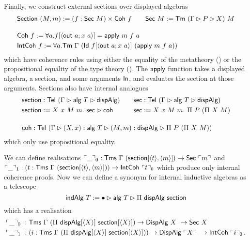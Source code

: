 Finally, we construct external sections over displayed algebras
\begin{align*}
     &\mta{Section}\ (M, m) := (f : \mta{Sec}\ M) \times \mta{Coh}\ f  \qquad \mta{Sec}\ M := \Tm\ (\Gamma \rhd P \rhd X)\ M \\[1em]
     &\mta{Coh}\ f := \forall a. f[\Msub{\mta{out}\ a; x\ a}] = \mta{apply}\ m\ f\ a \\
     &\mta{IntCoh}\ f := \forall a. \Tm\ \Gamma\ (\mta{Id}\ f[\Msub{\mta{out}\ a; x\ a}]\ (\mta{apply}\ m\ f\ a))
\end{align*}
which have coherence rules using either the equality of the metatheory () or
the propositional equality of the type theory ().
The $\textsf{apply}$ function takes a displayed algebra, a section, and some
arguments $\textsf{In}$, and evaluates the section at those arguments.
Sections also have internal analogues
\begin{align*}
    &\begin{alignedat}{2}
    &\mta{section} : \Tel\ (\Gamma \rhd \mta{alg}\ T \rhd \mta{dispAlg}) \qquad&&\mta{sec} : \Tel\ (\Gamma \rhd \mta{alg}\ T \rhd \mta{dispAlg})  \\
    &\mta{section} := X\ x\ M\ m.\ \mta{sec} \rhd \mta{coh} &&\mta{sec} := X\ x\ M\ m.\ \Pi\ P\ (\Pi\ X\ M)\\
    \end{alignedat} \\[1em]
    &\mta{coh} : \Tel\ (\Gamma \rhd (X, x) : \mta{alg}\ T\rhd (M, m) : \mta{dispAlg} \rhd \Pi\ P\ (\Pi\ X\ M))
\end{align*}
which only use propositional equality.

We can define realisations
$\emb{\_}_0 : \Tms\ \Gamma\ (\mta{section}[\Msub{t},\Msub{m}]) \to \mta{Sec}\ \emb{m}$ and
$\emb{\_}_1 : (t : \Tms\ \Gamma\ (\mta{section}[\Msub{t},\Msub{m}])) \to \mta{IntCoh}\ \emb{t}_0$
which produce only internal coherence proofs.
Now we can define a synonym for internal inductive algebras as a telescope
\[
    \mta{indAlg}\ T := \bullet \rhd \mta{alg}\ T \rhd \Pi\ \mta{dispAlg}\ \mta{section}
\]
which has a realisation
\begin{align*}
    &\emb{\_}_0\ : \mta{Tms}\ \Gamma\ (\Pi\ \mta{dispAlg}[\Msub X]\ \mta{section}[\Msub X]) \to \mta{DispAlg}\ X\ \to \mta{Sec}\ X \\
    &\emb{\_}_1\ : (i : \mta{Tms}\ \Gamma\ (\Pi\ \mta{dispAlg}[\Msub X]\ \mta{section}[\Msub X])) \to \mta{DispAlg}\ \emb{X}\ \to \mta{IntCoh}\ \emb{i}_0 \,.
\end{align*}


